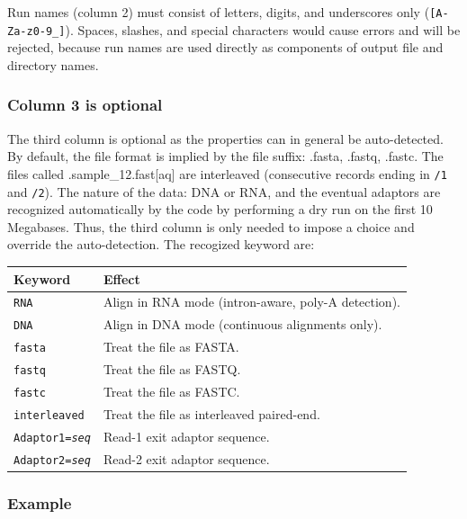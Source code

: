 \documentclass[11pt]{article}
\newcommand{\code}[1]{\texttt{#1}}
\begin{document}
\begin{warnbox}
Run names (column 2) must consist of letters, digits, and underscores
only (\code{[A-Za-z0-9\_]}).  Spaces, slashes, and special characters
would cause errors and will be rejected, because run names are used directly as components of
output file and directory names.
\end{warnbox}


\subsubsection{Column 3 is optional}

The third column is optional as the properties can in general be auto-detected.
By default, the file format is implied by the file suffix: .fasta, .fastq, .fastc.
The files called .sample\_12.fast[aq] are interleaved
(consecutive records ending in \code{/1} and \code{/2}).
The nature of the data: DNA or RNA, and the eventual adaptors are recognized automatically
by the code by performing a dry run on the first 10 Megabases.
Thus, the third column is only needed to impose a choice and override the auto-detection.
The recogized keyword are:


\medskip
\begin{center}
\begin{tabular}{lp{9.5cm}}
\toprule
\textbf{Keyword} & \textbf{Effect} \\
\midrule
\code{RNA}                   & Align in RNA mode (intron-aware, poly-A detection). \\
\code{DNA}                   & Align in DNA mode (continuous alignments only). \\
\code{fasta}                 & Treat the file as FASTA. \\
\code{fastq}                 & Treat the file as FASTQ. \\
\code{fastc}                 & Treat the file as FASTC. \\
\code{interleaved}           & Treat the file as interleaved paired-end. \\
\code{Adaptor1=\textit{seq}} & Read-1 exit adaptor sequence. \\
\code{Adaptor2=\textit{seq}} & Read-2 exit adaptor sequence. \\
\bottomrule
\end{tabular}
\end{center}
\medskip



\subsubsection{Example}
\end{document}
